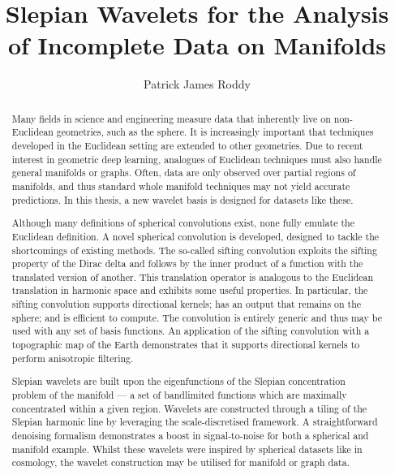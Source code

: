 
\title{Slepian Wavelets for the Analysis of Incomplete Data on Manifolds}
\author{Patrick James Roddy}

\maketitle
\makedeclaration{}

\begin{abstract} %
	Many fields in science and engineering measure data that inherently live on non-Euclidean geometries, such as the sphere.
	It is increasingly important that techniques developed in the Euclidean setting are extended to other geometries.
	Due to recent interest in geometric deep learning, analogues of Euclidean techniques must also handle general manifolds or graphs.
	Often, data are only observed over partial regions of manifolds, and thus standard whole manifold techniques may not yield accurate predictions.
	In this thesis, a new wavelet basis is designed for datasets like these.

	Although many definitions of spherical convolutions exist, none fully emulate the Euclidean definition.
	A novel spherical convolution is developed, designed to tackle the shortcomings of existing methods.
	The so-called sifting convolution exploits the sifting property of the Dirac delta and follows by the inner product of a function with the translated version of another.
	This translation operator is analogous to the Euclidean translation in harmonic space and exhibits some useful properties.
	In particular, the sifting convolution supports directional kernels; has an output that remains on the sphere; and is efficient to compute.
	The convolution is entirely generic and thus may be used with any set of basis functions.
	An application of the sifting convolution with a topographic map of the Earth demonstrates that it supports directional kernels to perform anisotropic filtering.

	Slepian wavelets are built upon the eigenfunctions of the Slepian concentration problem of the manifold --- a set of bandlimited functions which are maximally concentrated within a given region.
	Wavelets are constructed through a tiling of the Slepian harmonic line by leveraging the scale-discretised framework.
	A straightforward denoising formalism demonstrates a boost in signal-to-noise for both a spherical and manifold example.
	Whilst these wavelets were inspired by spherical datasets like in cosmology, the wavelet construction may be utilised for manifold or graph data.
\end{abstract}

